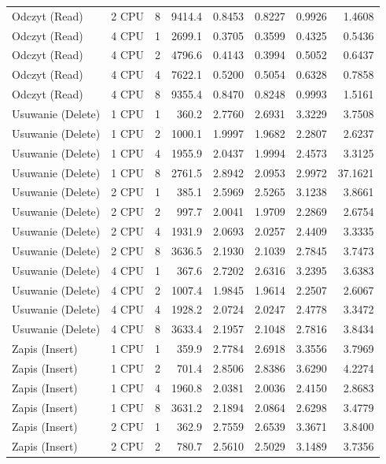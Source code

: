 \begin{table}[ht]
{\begin{tabular}{llcrrrrr}
Odczyt (Read) & 2 CPU & 8 & 9414.4 & 0.8453 & 0.8227 & 0.9926 & 1.4608 \\
Odczyt (Read) & 4 CPU & 1 & 2699.1 & 0.3705 & 0.3599 & 0.4325 & 0.5436 \\
Odczyt (Read) & 4 CPU & 2 & 4796.6 & 0.4143 & 0.3994 & 0.5052 & 0.6437 \\
Odczyt (Read) & 4 CPU & 4 & 7622.1 & 0.5200 & 0.5054 & 0.6328 & 0.7858 \\
Odczyt (Read) & 4 CPU & 8 & 9355.4 & 0.8470 & 0.8248 & 0.9993 & 1.5161 \\
Usuwanie (Delete) & 1 CPU & 1 & 360.2 & 2.7760 & 2.6931 & 3.3229 & 3.7508 \\
Usuwanie (Delete) & 1 CPU & 2 & 1000.1 & 1.9997 & 1.9682 & 2.2807 & 2.6237 \\
Usuwanie (Delete) & 1 CPU & 4 & 1955.9 & 2.0437 & 1.9994 & 2.4573 & 3.3125 \\
Usuwanie (Delete) & 1 CPU & 8 & 2761.5 & 2.8942 & 2.0953 & 2.9972 & 37.1621 \\
Usuwanie (Delete) & 2 CPU & 1 & 385.1 & 2.5969 & 2.5265 & 3.1238 & 3.8661 \\
Usuwanie (Delete) & 2 CPU & 2 & 997.7 & 2.0041 & 1.9709 & 2.2869 & 2.6754 \\
Usuwanie (Delete) & 2 CPU & 4 & 1931.9 & 2.0693 & 2.0257 & 2.4409 & 3.3335 \\
Usuwanie (Delete) & 2 CPU & 8 & 3636.5 & 2.1930 & 2.1039 & 2.7845 & 3.7473 \\
Usuwanie (Delete) & 4 CPU & 1 & 367.6 & 2.7202 & 2.6316 & 3.2395 & 3.6383 \\
Usuwanie (Delete) & 4 CPU & 2 & 1007.4 & 1.9845 & 1.9614 & 2.2507 & 2.6067 \\
Usuwanie (Delete) & 4 CPU & 4 & 1928.2 & 2.0724 & 2.0247 & 2.4778 & 3.3472 \\
Usuwanie (Delete) & 4 CPU & 8 & 3633.4 & 2.1957 & 2.1048 & 2.7816 & 3.8434 \\
Zapis (Insert) & 1 CPU & 1 & 359.9 & 2.7784 & 2.6918 & 3.3556 & 3.7969 \\
Zapis (Insert) & 1 CPU & 2 & 701.4 & 2.8506 & 2.8386 & 3.6290 & 4.2274 \\
Zapis (Insert) & 1 CPU & 4 & 1960.8 & 2.0381 & 2.0036 & 2.4150 & 2.8683 \\
Zapis (Insert) & 1 CPU & 8 & 3631.2 & 2.1894 & 2.0864 & 2.6298 & 3.4779 \\
Zapis (Insert) & 2 CPU & 1 & 362.9 & 2.7559 & 2.6539 & 3.3671 & 3.8400 \\
Zapis (Insert) & 2 CPU & 2 & 780.7 & 2.5610 & 2.5029 & 3.1489 & 3.7356 \\

\end{tabular}}
\end{table}
